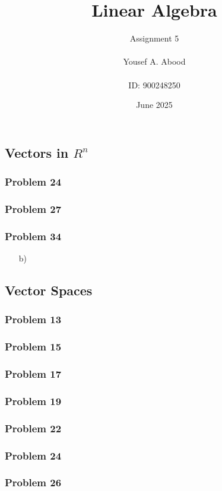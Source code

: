 \documentclass[a4paper,12pt]{article}
\title{Linear Algebra}
\author{Assignment 5\\ \\ Yousef A. Abood\\ \\ ID: 900248250}
\date{June 2025}
\begin{document}
\maketitle
\noindent\makebox[\linewidth]{\rule{15cm}{0.4pt}}
\subsection{Vectors in $R^n$}
\subsubsection*{Problem 24}
\subsubsection*{Problem 27}
\subsubsection*{Problem 34}
\begin{itemize}
    \item [b)]
\end{itemize}
\subsection{Vector Spaces}
\subsubsection*{Problem 13}
\subsubsection*{Problem 15}
\subsubsection*{Problem 17}
\subsubsection*{Problem 19}
\subsubsection*{Problem 22}
\subsubsection*{Problem 24}
\subsubsection*{Problem 26}
\end{document}
